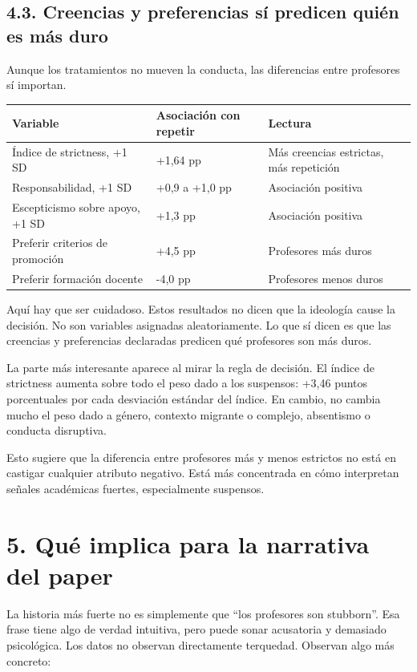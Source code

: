 \documentclass[12pt,a4paper]{article}
\newcommand{\pp}{puntos porcentuales}
\begin{document}
\subsection*{4.3. Creencias y preferencias sí predicen quién es más duro}

Aunque los tratamientos no mueven la conducta, las diferencias entre profesores sí importan.

\begin{center}
\small
\begin{tabular}{L{0.34\textwidth}L{0.22\textwidth}L{0.30\textwidth}}
\toprule
Variable & Asociación con repetir & Lectura\\
\midrule
Índice de strictness, +1 SD & +1,64 pp & Más creencias estrictas, más repetición\\
Responsabilidad, +1 SD & +0,9 a +1,0 pp & Asociación positiva\\
Escepticismo sobre apoyo, +1 SD & +1,3 pp & Asociación positiva\\
Preferir criterios de promoción & +4,5 pp & Profesores más duros\\
Preferir formación docente & -4,0 pp & Profesores menos duros\\
\bottomrule
\end{tabular}
\end{center}

Aquí hay que ser cuidadoso. Estos resultados no dicen que la ideología cause la decisión. No son variables asignadas aleatoriamente. Lo que sí dicen es que las creencias y preferencias declaradas predicen qué profesores son más duros.

La parte más interesante aparece al mirar la regla de decisión. El índice de strictness aumenta sobre todo el peso dado a los suspensos: +3,46 \pp{} por cada desviación estándar del índice. En cambio, no cambia mucho el peso dado a género, contexto migrante o complejo, absentismo o conducta disruptiva.

Esto sugiere que la diferencia entre profesores más y menos estrictos no está en castigar cualquier atributo negativo. Está más concentrada en cómo interpretan señales académicas fuertes, especialmente suspensos.

\section*{5. Qué implica para la narrativa del paper}

La historia más fuerte no es simplemente que ``los profesores son stubborn''. Esa frase tiene algo de verdad intuitiva, pero puede sonar acusatoria y demasiado psicológica. Los datos no observan directamente terquedad. Observan algo más concreto:
\end{document}

